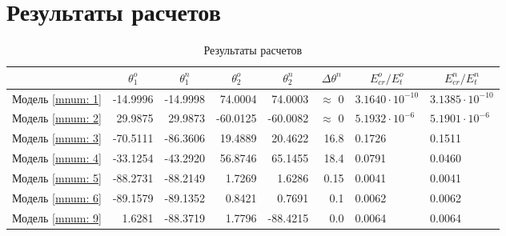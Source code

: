 \section{Результаты расчетов}

\begin{table}
\footnotesize
\centering
\caption{Результаты расчетов}
\renewcommand{\arraystretch}{1.5}
\begin{tabularx}{\textwidth}{C|rr|rr|r|ll}
				& &  &  &  & &  &  \\ \hline
\hline Модель \ref{mnum: 1} & -14.9996 & -14.9998 & 74.0004 & 74.0003 & $\approx$ 0   & $3.1640 \cdot 10^{-10}$ & $3.1385 \cdot 10^{-10}$ \\ 
	   Модель \ref{mnum: 2} & 29.9875  & 29.9873  & -60.0125& -60.0082& $\approx$ 0   & $5.1932 \cdot 10^{-6}$  & $5.1901 \cdot 10^{-6}$ \\ 
 	   Модель \ref{mnum: 3} & -70.5111 & -86.3606 & 19.4889 & 20.4622 & 16.8 & 0.1726 & 0.1511 \\ 
 	   Модель \ref{mnum: 4} & -33.1254 & -43.2920 & 56.8746 & 65.1455 & 18.4 & 0.0791 & 0.0460 \\ 
 	   Модель \ref{mnum: 5} & -88.2731 & -88.2149 & 1.7269  & 1.6286  & 0.15 & 0.0041 & 0.0041 \\
 	   Модель \ref{mnum: 6} & -89.1579 & -89.1352 & 0.8421  & 0.7691  & 0.1  & 0.0062 & 0.0062 \\
 	   Модель \ref{mnum: 9} & 1.6281 & -88.3719 & 1.7796  & -88.4215  & 0.0  & 0.0064 & 0.0064 \\
 	   \hline
\end{tabularx} 
\renewcommand{\arraystretch}{1.0}
\end{table}

